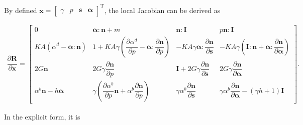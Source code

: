\documentclass[11pt,fleqn,3p]{elsarticle}
\newcommand*{\mT}{\mathrm{T}}
\newcommand*{\pfrac}[2]{\dfrac{\partial#1}{\partial#2}}
\begin{document}
By defined $\mathbold{x}=\begin{bmatrix}\gamma&p&\mathbold{s}&\mathbold{\alpha}\end{bmatrix}^\mT$, the local Jacobian can be derived as
\begin{small}
\begin{gather*}
\pfrac{\mathbold{R}}{\mathbold{x}}=
\begin{bmatrix}
	0                                                      & \mathbold{\alpha}:\mathbold{n}+m                                                     & \mathbold{n}:\mathbf{I}                                       & p\mathbold{n}:\mathbf{I}                                                                                \\[4mm]
	KA\left(\alpha^d-\mathbold{\alpha}:\mathbold{n}\right) & 1+KA\gamma\left(\pfrac{\alpha^d}{p}-\mathbold{\alpha}:\pfrac{\mathbold{n}}{p}\right) & -KA\gamma\mathbold{\alpha}:\pfrac{\mathbold{n}}{\mathbold{s}} & -KA\gamma\left(\mathbf{I}:\mathbold{n}+\mathbold{\alpha}:\pfrac{\mathbold{n}}{\mathbold{\alpha}}\right) \\[4mm]
	2G\mathbold{n}                                         & 2G\gamma\pfrac{\mathbold{n}}{p}                                                      & \mathbf{I}+2G\gamma\pfrac{\mathbold{n}}{\mathbold{s}}         & 2G\gamma\pfrac{\mathbold{n}}{\mathbold{\alpha}}                                                         \\[4mm]
	\alpha^b\mathbold{n}-h\mathbold{\alpha}                & \gamma\left(\pfrac{\alpha^b}{p}\mathbold{n}+\alpha^b\pfrac{\mathbold{n}}{p}\right)   & \gamma\alpha^b\pfrac{\mathbold{n}}{\mathbold{s}}              & \gamma\alpha^b\pfrac{\mathbold{n}}{\mathbold{\alpha}}-\left(\gamma{}h+1\right)\mathbf{I}
\end{bmatrix}.
\end{gather*}
\end{small}
In the explicit form, it is
\end{document}
